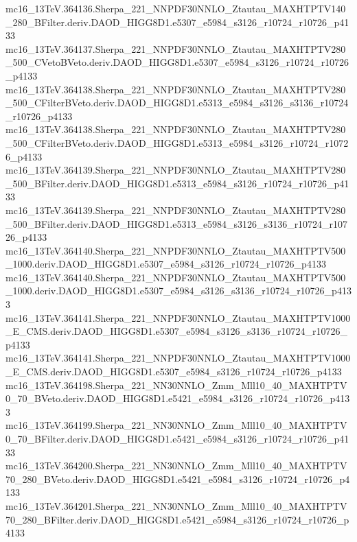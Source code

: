 \begin{scriptsize}
mc16\_13TeV.364136.Sherpa\_221\_NNPDF30NNLO\_Ztautau\_MAXHTPTV140\_280\_BFilter.deriv.DAOD\_HIGG8D1.e5307\_e5984\_s3126\_r10724\_r10726\_p4133 \\
mc16\_13TeV.364137.Sherpa\_221\_NNPDF30NNLO\_Ztautau\_MAXHTPTV280\_500\_CVetoBVeto.deriv.DAOD\_HIGG8D1.e5307\_e5984\_s3126\_r10724\_r10726\_p4133 \\
mc16\_13TeV.364138.Sherpa\_221\_NNPDF30NNLO\_Ztautau\_MAXHTPTV280\_500\_CFilterBVeto.deriv.DAOD\_HIGG8D1.e5313\_e5984\_s3126\_s3136\_r10724\_r10726\_p4133 \\
mc16\_13TeV.364138.Sherpa\_221\_NNPDF30NNLO\_Ztautau\_MAXHTPTV280\_500\_CFilterBVeto.deriv.DAOD\_HIGG8D1.e5313\_e5984\_s3126\_r10724\_r10726\_p4133 \\
mc16\_13TeV.364139.Sherpa\_221\_NNPDF30NNLO\_Ztautau\_MAXHTPTV280\_500\_BFilter.deriv.DAOD\_HIGG8D1.e5313\_e5984\_s3126\_r10724\_r10726\_p4133 \\
mc16\_13TeV.364139.Sherpa\_221\_NNPDF30NNLO\_Ztautau\_MAXHTPTV280\_500\_BFilter.deriv.DAOD\_HIGG8D1.e5313\_e5984\_s3126\_s3136\_r10724\_r10726\_p4133 \\
mc16\_13TeV.364140.Sherpa\_221\_NNPDF30NNLO\_Ztautau\_MAXHTPTV500\_1000.deriv.DAOD\_HIGG8D1.e5307\_e5984\_s3126\_r10724\_r10726\_p4133 \\
mc16\_13TeV.364140.Sherpa\_221\_NNPDF30NNLO\_Ztautau\_MAXHTPTV500\_1000.deriv.DAOD\_HIGG8D1.e5307\_e5984\_s3126\_s3136\_r10724\_r10726\_p4133 \\
mc16\_13TeV.364141.Sherpa\_221\_NNPDF30NNLO\_Ztautau\_MAXHTPTV1000\_E\_CMS.deriv.DAOD\_HIGG8D1.e5307\_e5984\_s3126\_s3136\_r10724\_r10726\_p4133 \\
mc16\_13TeV.364141.Sherpa\_221\_NNPDF30NNLO\_Ztautau\_MAXHTPTV1000\_E\_CMS.deriv.DAOD\_HIGG8D1.e5307\_e5984\_s3126\_r10724\_r10726\_p4133 \\
mc16\_13TeV.364198.Sherpa\_221\_NN30NNLO\_Zmm\_Mll10\_40\_MAXHTPTV0\_70\_BVeto.deriv.DAOD\_HIGG8D1.e5421\_e5984\_s3126\_r10724\_r10726\_p4133 \\
mc16\_13TeV.364199.Sherpa\_221\_NN30NNLO\_Zmm\_Mll10\_40\_MAXHTPTV0\_70\_BFilter.deriv.DAOD\_HIGG8D1.e5421\_e5984\_s3126\_r10724\_r10726\_p4133 \\
mc16\_13TeV.364200.Sherpa\_221\_NN30NNLO\_Zmm\_Mll10\_40\_MAXHTPTV70\_280\_BVeto.deriv.DAOD\_HIGG8D1.e5421\_e5984\_s3126\_r10724\_r10726\_p4133 \\
mc16\_13TeV.364201.Sherpa\_221\_NN30NNLO\_Zmm\_Mll10\_40\_MAXHTPTV70\_280\_BFilter.deriv.DAOD\_HIGG8D1.e5421\_e5984\_s3126\_r10724\_r10726\_p4133 \\

\end{scriptsize}
